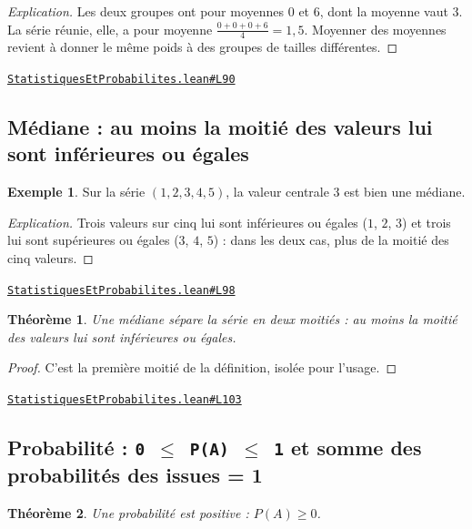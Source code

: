 \documentclass[11pt,a4paper]{article}
\theoremstyle{definition}
\newtheorem{exemple}{Exemple}
\theoremstyle{plain}
\newtheorem{theoreme}{Théorème}
\newenvironment{explication}{\begin{proof}[Explication]}{\end{proof}}
\newcommand{\source}[2]{\par\smallskip\noindent\hfill{\footnotesize\href{#1}{\texttt{#2}}}\par\smallskip}
\begin{document}
\begin{explication}
Les deux groupes ont pour moyennes $0$ et $6$, dont la moyenne vaut $3$. La série
réunie, elle, a pour moyenne $\tfrac{0+0+0+6}{4} = 1{,}5$. Moyenner des moyennes revient
à donner le même poids à des groupes de tailles différentes.
\end{explication}
\source{https://github.com/Commutator-IO/learn-lean/blob/main/courses/01-college/06-statistiques-et-probabilites/StatistiquesEtProbabilites.lean\#L90}{StatistiquesEtProbabilites.lean\#L90}

\subsection{Médiane : au moins la moitié des valeurs lui sont inférieures ou égales}

\begin{exemple}
Sur la série $(1, 2, 3, 4, 5)$, la valeur centrale $3$ est bien une médiane.
\end{exemple}

\begin{explication}
Trois valeurs sur cinq lui sont inférieures ou égales ($1$, $2$, $3$) et trois lui sont
supérieures ou égales ($3$, $4$, $5$) : dans les deux cas, plus de la moitié des cinq
valeurs.
\end{explication}
\source{https://github.com/Commutator-IO/learn-lean/blob/main/courses/01-college/06-statistiques-et-probabilites/StatistiquesEtProbabilites.lean\#L98}{StatistiquesEtProbabilites.lean\#L98}

\begin{theoreme}
Une médiane sépare la série en deux moitiés : au moins la moitié des valeurs lui sont
inférieures ou égales.
\end{theoreme}

\begin{proof}
C'est la première moitié de la définition, isolée pour l'usage.
\end{proof}
\source{https://github.com/Commutator-IO/learn-lean/blob/main/courses/01-college/06-statistiques-et-probabilites/StatistiquesEtProbabilites.lean\#L103}{StatistiquesEtProbabilites.lean\#L103}

\subsection{Probabilité : \texttt{0 \(\le\) P(A) \(\le\) 1} et somme des probabilités des issues = 1}

\begin{theoreme}
Une probabilité est positive : $P(A) \ge 0$.
\end{theoreme}
\end{document}

